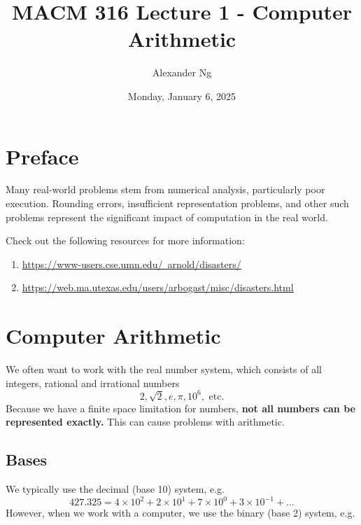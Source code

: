 \documentclass[12pt]{article}
\newcommand{\ulhref}[2]{\href{#1}{\color{blue}\uline{#2}}}
\begin{document}
\title{MACM 316 Lecture 1 - Computer Arithmetic}
\author{Alexander Ng}
\date{Monday, January 6, 2025}

\maketitle

\section{Preface}

Many real-world problems stem from numerical analysis, particularly poor 
execution. Rounding errors, insufficient representation problems, and other 
such problems represent the significant impact of computation in the real world.

Check out the following resources for more information:
\begin{enumerate}
  \item \ulhref{https://www-users.cse.umn.edu/~arnold/disasters/}{https://www-users.cse.umn.edu/~arnold/disasters/}
  \item \ulhref{https://web.ma.utexas.edu/users/arbogast/misc/disasters.html}{https://web.ma.utexas.edu/users/arbogast/misc/disasters.html}
\end{enumerate}

\section{Computer Arithmetic}

We often want to work with the real number system, which consists of all 
integers, rational and irrational numbers
\begin{equation*}
  2, \sqrt{2}, e, \pi, 10^6, \text{ etc.} 
\end{equation*}
Because we have a finite space limitation for numbers, 
\textbf{not all numbers can be represented exactly.} This can cause problems
with arithmetic.

\subsection{Bases}

We typically use the decimal (base 10) system, e.g.
\begin{equation*}
  427.325 = 4 \times 10^2 + 2 \times 10^1 + 7 \times 10^{0} + 3 \times 10^{-1}+\dots
\end{equation*}
However, when we work with a computer, we use the binary (base 2) system, e.g.
\end{document}

